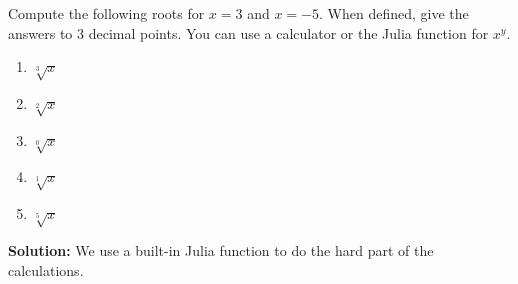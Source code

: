 \begin{example} Compute the following roots for $x=3$ and $x = -5$. When defined, give the answers to 3 decimal points. You can use a calculator or the Julia function for $x^y$.
\begin{enumerate}
\renewcommand{\labelenumi}{(\alph{enumi})}
\setlength{\itemsep}{.2cm}
\item $\sqrt[3]{x}$
\item $\sqrt[2]{x}$
\item $\sqrt[0]{x}$
\item $\sqrt[1]{x}$
\item $\sqrt[5]{x}$
\end{enumerate}    
\end{example}

\textbf{Solution:}
We use a built-in Julia function to do the hard part of the calculations.

